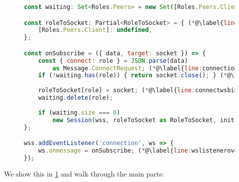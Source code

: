 \begin{figure}[!h]
\begin{lstlisting}[language=javascript,tabsize=2]
const waiting: Set<Roles.Peers> = new Set([Roles.Peers.Client]); (*@\label{line:initwaiting}@*)

const roleToSocket: Partial<RoleToSocket> = { (*@\label{line:initroletosocket}@*)
	[Roles.Peers.Client]: undefined,
};

const onSubscribe = ({ data, target: socket }) => {
	const { connect: role } = JSON.parse(data) 
		as Message.ConnectRequest; (*@\label{line:connectionrequest}@*)
	if (!waiting.has(role)) { return socket.close(); } (*@\label{line:occupied}@*)
	
	roleToSocket[role] = socket; (*@\label{line:connectwsbind}@*)
	waiting.delete(role);
	
	if (waiting.size === 0)
		new Session(wss, roleToSocket as RoleToSocket, initialState); (*@\label{line:newsession}@*)
};

wss.addEventListener('connection', ws => {
	ws.onmessage = onSubscribe; (*@\label{line:wslisteneroverride}@*)
});
\end{lstlisting}
\label{lst:nodeconnect}
\end{figure}

We show this in \cref{lst:nodeconnect} and walk through
the main parts:

